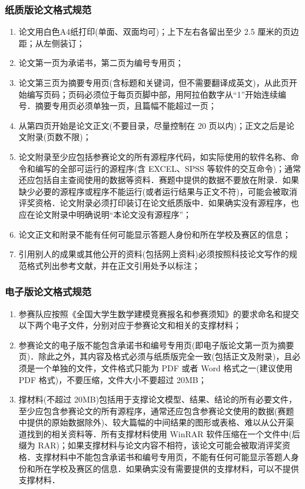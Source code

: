 \documentclass{JXUSTmodeling}
\begin{document}
   \subsubsection{纸质版论文格式规范}
   \begin{enumerate}
       \item 论文用白色A4纸打印(单面、双面均可)；上下左右各留出至少 2.5 厘米的页边距；从左侧装订；
       \item 论文第一页为承诺书，第二页为编号专用页；
       \item 论文第三页为摘要专用页(含标题和关键词，但不需要翻译成英文)，从此页开始编写页码；页码必须位于每页页脚中部，用阿拉伯数字从“1”开始连续编号．摘要专用页必须单独一页，且篇幅不能超过一页；
       \item 从第四页开始是论文正文(不要目录，尽量控制在 20 页以内)；正文之后是论文附录(页数不限)；
       \item 论文附录至少应包括参赛论文的所有源程序代码，如实际使用的软件名称、命令和编写的全部可运行的源程序(含 EXCEL、SPSS 等软件的交互命令)；通常还应包括自主查阅使用的数据等资料．赛题中提供的数据不要放在附录．如果缺少必要的源程序或程序不能运行(或者运行结果与正文不符)，可能会被取消评奖资格．论文附录必须打印装订在论文纸质版中．如果确实没有源程序，也应在论文附录中明确说明“本论文没有源程序”；
       \item 论文正文和附录不能有任何可能显示答题人身份和所在学校及赛区的信息；
       \item 引用别人的成果或其他公开的资料(包括网上资料)必须按照科技论文写作的规范格式列出参考文献，并在正文引用处予以标注；
   \end{enumerate}

   \subsubsection{电子版论文格式规范}
   \begin{enumerate}
       \item 参赛队应按照《全国大学生数学建模竞赛报名和参赛须知》的要求命名和提交以下两个电子文件，分别对应于参赛论文和相关的支撑材料；
       \item 参赛论文的电子版不能包含承诺书和编号专用页(即电子版论文第一页为摘要页)．除此之外，其内容及格式必须与纸质版完全一致(包括正文及附录)，且必须是一个单独的文件，文件格式只能为 PDF 或者 Word 格式之一(建议使用 PDF 格式)，不要压缩，文件大小不要超过 20MB；
       \item 撑材料(不超过 20MB)包括用于支撑论文模型、结果、结论的所有必要文件，至少应包含参赛论文的所有源程序，通常还应包含参赛论文使用的数据(赛题中提供的原始数据除外)、较大篇幅的中间结果的图形或表格、难以从公开渠道找到的相关资料等．所有支撑材料使用 WinRAR 软件压缩在一个文件中(后缀为 RAR)；如果支撑材料与论文内容不相符，该论文可能会被取消评奖资格．支撑材料中不能包含承诺书和编号专用页，不能有任何可能显示答题人身份和所在学校及赛区的信息．如果确实没有需要提供的支撑材料，可以不提供支撑材料．
    \end{enumerate}
   
\end{document}
